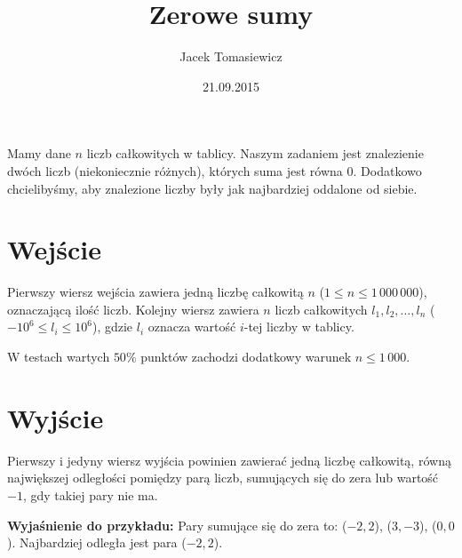 \documentclass[zad,zawodnik,utf8]{sinol}
\title{Zerowe sumy}
\author{Jacek Tomasiewicz}
\date{21.09.2015}
\begin{document}
  \begin{tasktext}%
Mamy dane $n$ liczb całkowitych w tablicy. Naszym zadaniem jest znalezienie dwóch liczb (niekoniecznie różnych), których suma jest równa 0. Dodatkowo chcielibyśmy, aby znalezione liczby były jak najbardziej oddalone od siebie. 

  \section{Wejście}
	
Pierwszy wiersz wejścia zawiera jedną liczbę całkowitą $n$ ($1 \leq n \leq 1\,000\,000$), oznaczającą ilość liczb. Kolejny wiersz zawiera $n$ liczb całkowitych $l_1, l_2, \ldots, l_n$ ($-10^6 \leq l_i \leq 10^6$), gdzie $l_i$ oznacza wartość $i$-tej liczby w tablicy.

W testach wartych $50\%$ punktów zachodzi dodatkowy warunek $n \leq 1\,000$.

  \section{Wyjście}
	Pierwszy i jedyny wiersz wyjścia powinien zawierać jedną liczbę całkowitą, równą największej odległości pomiędzy parą liczb, sumujących się do zera lub wartość $-1$, gdy takiej pary nie ma.

     \makecompactexample

\medskip
\noindent
\textbf {Wyjaśnienie do przykładu:} Pary sumujące się do zera to: ($-2, 2$), ($3, -3$), ($0, 0$). Najbardziej odległa jest para ($-2, 2$).

  \end{tasktext}
\end{document}
